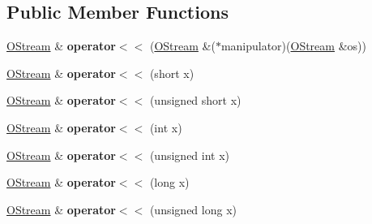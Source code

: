 \subsection*{Public Member Functions}
\begin{DoxyCompactItemize}
\item 
\hypertarget{classv8_1_1internal_1_1_o_stream_a361b2d0eeaf707e69175139c0ed3c812}{}\hyperlink{classv8_1_1internal_1_1_o_stream}{O\+Stream} \& {\bfseries operator$<$$<$} (\hyperlink{classv8_1_1internal_1_1_o_stream}{O\+Stream} \&($\ast$manipulator)(\hyperlink{classv8_1_1internal_1_1_o_stream}{O\+Stream} \&os))\label{classv8_1_1internal_1_1_o_stream_a361b2d0eeaf707e69175139c0ed3c812}

\item 
\hypertarget{classv8_1_1internal_1_1_o_stream_ace6b7151631b60a4de459a847d48c865}{}\hyperlink{classv8_1_1internal_1_1_o_stream}{O\+Stream} \& {\bfseries operator$<$$<$} (short x)\label{classv8_1_1internal_1_1_o_stream_ace6b7151631b60a4de459a847d48c865}

\item 
\hypertarget{classv8_1_1internal_1_1_o_stream_a0424da67b32c62ea20361bacc3204559}{}\hyperlink{classv8_1_1internal_1_1_o_stream}{O\+Stream} \& {\bfseries operator$<$$<$} (unsigned short x)\label{classv8_1_1internal_1_1_o_stream_a0424da67b32c62ea20361bacc3204559}

\item 
\hypertarget{classv8_1_1internal_1_1_o_stream_a1f6f0f11cefca4195c2ffd5ad20c467c}{}\hyperlink{classv8_1_1internal_1_1_o_stream}{O\+Stream} \& {\bfseries operator$<$$<$} (int x)\label{classv8_1_1internal_1_1_o_stream_a1f6f0f11cefca4195c2ffd5ad20c467c}

\item 
\hypertarget{classv8_1_1internal_1_1_o_stream_afa0ca83da9255ce2f48db566f00f2fdd}{}\hyperlink{classv8_1_1internal_1_1_o_stream}{O\+Stream} \& {\bfseries operator$<$$<$} (unsigned int x)\label{classv8_1_1internal_1_1_o_stream_afa0ca83da9255ce2f48db566f00f2fdd}

\item 
\hypertarget{classv8_1_1internal_1_1_o_stream_ac35aa1571f4323eda1e856ce595eae5b}{}\hyperlink{classv8_1_1internal_1_1_o_stream}{O\+Stream} \& {\bfseries operator$<$$<$} (long x)\label{classv8_1_1internal_1_1_o_stream_ac35aa1571f4323eda1e856ce595eae5b}

\item 
\hypertarget{classv8_1_1internal_1_1_o_stream_a38e7c3fba32821bd105ae7131fadf339}{}\hyperlink{classv8_1_1internal_1_1_o_stream}{O\+Stream} \& {\bfseries operator$<$$<$} (unsigned long x)\label{classv8_1_1internal_1_1_o_stream_a38e7c3fba32821bd105ae7131fadf339}


\end{DoxyCompactItemize}
